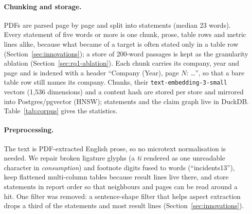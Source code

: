 \documentclass[11pt]{article}
\newcommand{\embmodel}{\texttt{text-embedding-3-small}}
\begin{document}
\paragraph{Chunking and storage.}
PDFs are parsed page by page and split into statements (median 23 words). Every statement of five words or more is one chunk, prose, table rows and metric lines alike, because what became of a target is often stated only in a table row (Section~\ref{sec:innovations}); a store of 200-word passages is kept as the granularity ablation (Section~\ref{sec:rq1-ablation}). Each chunk carries its company, year and page and is indexed with a header ``Company (Year), page $N$: \ldots'', so that a bare table row still names its company. Chunks, their \embmodel{} vectors (1,536 dimensions) and a content hash are stored per store and mirrored into Postgres/pgvector (HNSW); statements and the claim graph live in DuckDB. Table~\ref{tab:corpus} gives the statistics.

\paragraph{Preprocessing.}
\label{sec:preprocessing}
The text is PDF-extracted English prose, so no microtext normalisation is needed. We repair broken ligature glyphs (a \emph{ti} rendered as one unreadable character in \emph{consumption}) and footnote digits fused to words (``incidents13''), keep flattened multi-column tables because result lines live there, and store statements in report order so that neighbours and pages can be read around a hit. One filter was removed: a sentence-shape filter that helps aspect extraction drops a third of the statements and most result lines (Section~\ref{sec:innovations}).
\end{document}
